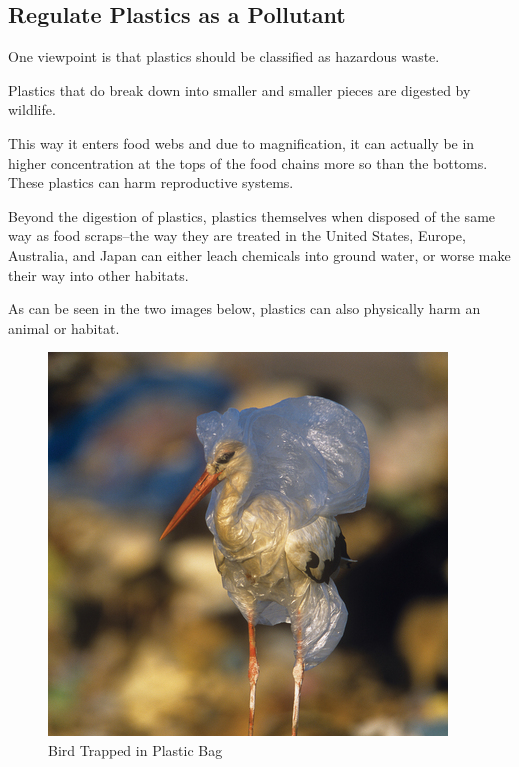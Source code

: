 \documentclass[paper=a4, fontsize=11pt]{article}
\begin{document}
\subsection{Regulate Plastics as a Pollutant}
One viewpoint is that plastics should be classified as hazardous waste. 

Plastics that do break down into smaller and smaller pieces are digested by wildlife.

This way it enters food webs and due to magnification, it can actually be in higher concentration at the 
tops of the food chains more so than the bottoms. 
These plastics can harm reproductive systems.

Beyond the digestion of plastics, plastics themselves when disposed of the same way as food scraps--the way they are treated in 
the United States, Europe, Australia, and Japan can either leach chemicals into ground water, or worse make their way into other
habitats. 

As can be seen in the two images below, plastics can also physically harm an animal or habitat. 

\begin{figure}[ht!]
\includegraphics[scale=.5]{plastic_bird.jpg}
\caption{Bird Trapped in Plastic Bag \cite{long_term}}
\end{figure}
\cite{long_term}
\end{document}
